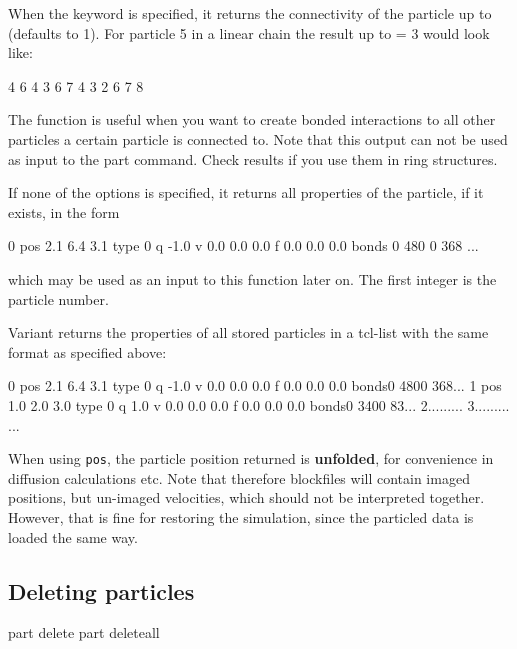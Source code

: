 When the keyword  is specified, it returns the
connectivity of the particle up to  (defaults to 1). For
particle 5 in a linear chain the result up to  = 3 would
look like:
\begin{tclcode}
{ { 4 } { 6 } } { { 4 3 } { 6 7 } } { {4 3 2 } { 6 7 8 } } 
\end{tclcode}
The function is useful when you want to create bonded interactions to
all other particles a certain particle is connected to. Note that this
output can not be used as input to the part command. Check results if
you use them in ring structures.

If none of the options is specified, it returns all properties of the
particle, if it exists, in the form
\begin{tclcode}
  0 pos 2.1 6.4 3.1 type 0 q -1.0 v 0.0 0.0 0.0 f 0.0 0.0 0.0
  bonds { {0 480} {0 368} ... } 
\end{tclcode}
which may be used as an input to this function later on. The first
integer is the particle number.

Variant  returns the properties of all stored particles in
a tcl-list with the same format as specified above:
\begin{tclcode}
{0 pos 2.1 6.4 3.1 type 0 q -1.0 v 0.0 0.0 0.0 f 0.0 0.0 0.0
 bonds{{0 480}{0 368}...}} 
{1 pos 1.0 2.0 3.0 type 0 q 1.0 v 0.0 0.0 0.0 f 0.0 0.0 0.0
 bonds{{0 340}{0 83}...}} 
{2...{{...}...}}
{3...{{...}...}}
...
\end{tclcode}

When using \texttt{pos}, the particle position returned is \textbf{unfolded},
for convenience in diffusion calculations etc.  Note that
therefore blockfiles will contain imaged positions, but un-imaged
velocities, which should not be interpreted together. However, that is
fine for restoring the simulation, since the particled data is loaded
the same way.

\subsection{Deleting  particles}
\label{tcl:part:delete}

\begin{pysyntax}
\end{pysyntax}


\begin{essyntax}
   part  delete
   part deleteall
\end{essyntax}

